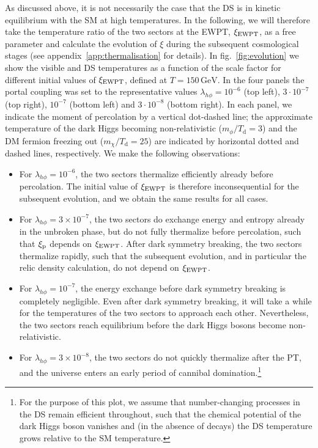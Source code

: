 As discussed above, it is not necessarily the case that the \ac{DS}	is in kinetic equilibrium with the \ac{SM} at high temperatures. In the following, we will therefore take the temperature ratio of the two sectors at the \ac{EWPT}, $\xi_{\text{EWPT}}$, as a free parameter and calculate the evolution of $\xi$ during the subsequent cosmological stages (see appendix~\ref{app:thermalisation} for details). In fig.~\ref{fig:evolution} we show the visible and \ac{DS} temperatures as a function of the scale factor for different initial values of $\xi_{\text{EWPT}}$, defined at $T = 150 \, \text{GeV}$. In the four panels  the portal coupling was set to the representative values $\lambda_{h\phi} = 10^{-6}$ (top left), $3 \cdot 10^{-7}$ (top right), $10^{-7}$ (bottom left) and $3 \cdot 10^{-8}$ (bottom right). In each panel, we indicate the moment of percolation by a vertical dot-dashed line; the approximate temperature of the dark Higgs becoming non-relativistic ($m_\phi / T_\text{d} = 3$) and the \ac{DM} fermion freezing out ($m_\chi / T_\text{d} = 25$) are indicated by horizontal dotted and dashed lines, respectively. We make the following observations:
\begin{itemize}
	\item For $\lambda_{h\phi} = 10^{-6}$, the two sectors thermalize efficiently already before percolation. The initial value of $\xi_{\text{EWPT}}$ is therefore inconsequential for the subsequent evolution, and we obtain the same results for all cases.
	\item For $\lambda_{h\phi} = 3 \times 10^{-7}$, the two sectors do exchange energy and entropy already in the unbroken phase, but do not fully thermalize before percolation, such that $\xi_{\text{p}}$ depends on $\xi_{\text{EWPT}}$. After dark symmetry breaking, the two sectors thermalize rapidly, such that the subsequent evolution, and in particular the relic density calculation, do not depend on $\xi_{\text{EWPT}}$.
	\item For $\lambda_{h\phi} = 10^{-7}$, the energy exchange before dark symmetry breaking is completely negligible. Even after dark symmetry breaking, it will take a while for the temperatures of the two sectors to approach each other. Nevertheless, the two sectors reach equilibrium before the dark Higgs bosons become non-relativistic.
	\item For $\lambda_{h\phi} = 3 \times 10^{-8}$, the two sectors do not quickly thermalize after the \ac{PT}, and the universe enters an early period of cannibal domination.\footnote{For the purpose of this plot, we assume that number-changing processes in the \ac{DS} remain efficient throughout, such that the chemical potential of the dark Higgs boson vanishes and (in the absence of decays) the \ac{DS} temperature grows relative to the \ac{SM} temperature.}
\end{itemize}
